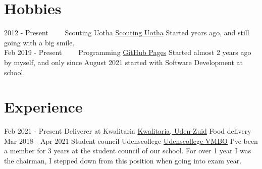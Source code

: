 \documentclass[letterpaper]{twentysecondcv} %
\begin{document}
\section{Hobbies}

\begin{twenty} %
	\twentyitem
    	{2012 -}
        {Present~~~~}
        {Scouting Uotha}
        {\href{https://www.uotha.nl/}{Scouting Uotha}}
        {}
        { Started years ago, and still going with a big smile.}\\
	\twentyitem
    	{Feb 2019 -}
        {Present~~~~}
        {Programming}
        {\href{https://tais993.github.io/}{GitHub Pages}}
        {}
        {Started almost 2 years ago by myself, and only since August 2021 started with Software Development at school.}
\end{twenty}

\vspace{6mm}



\section{Experience}
\begin{twenty} %
	\twentyitem
    		{Feb 2021 -}
		{Present}
        		{Deliverer at Kwalitaria}
        		{\href{https://kwalitaria.nl/uden-zuid/uden-zuid/}{Kwalitaria, Uden-Zuid}}
        		{}
        		{Food delivery}\\
		\twentyitem
    		{Mar 2018 -}
		{Apr 2021}
        		{Student council Udenscollege}
        		{\href{https://www.udenscollege.nl/vmbo/startpagina-vmbo/}{Udenscollege VMBO}}
        		{}
        		{
        		    I've been a member for 3 years at the student council of our school.
        		    For over 1 year I was the chairman, I stepped down from this position when going into exam year.
        		}
\end{twenty}

\vspace{6mm}


\end{document}
